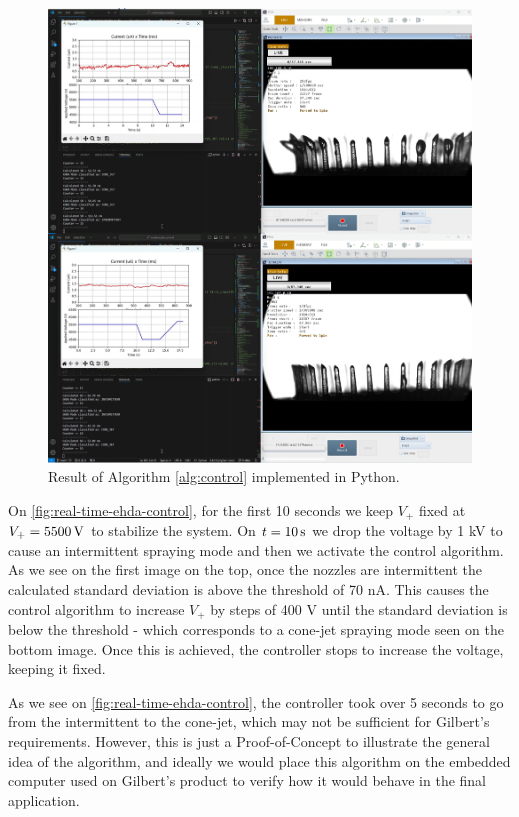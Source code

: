 \documentclass[oneside,12pt]{article}
\begin{document}
\begin{figure}[h!]
    \centering
    \includegraphics[width=\textwidth,trim=1 1 1 1,clip]{figures/real-time-ehda-control.png}
    \caption{Result of Algorithm \ref{alg:control} implemented in Python.}
    \label{fig:real-time-ehda-control}
\end{figure}

On \autoref{fig:real-time-ehda-control}, for the first 10 seconds we keep $V_+$ fixed at $V_+ = 5500 \,\mathrm{V}$ to stabilize the system.
On $t = 10 \,\mathrm{s}$ we drop the voltage by 1 kV to cause an intermittent spraying mode and then we activate the control algorithm. 
As we see on the first image on the top, once the nozzles are intermittent the calculated standard deviation is above the threshold of
70 nA. This causes the control algorithm to increase $V_+$ by steps of 400 V until the standard deviation is below the threshold - which
corresponds to a cone-jet spraying mode seen on the bottom image.
Once this is achieved, the controller stops to increase the voltage, keeping it fixed.  

As we see on \autoref{fig:real-time-ehda-control}, the controller took over 5 seconds to go from the intermittent to the cone-jet, which 
may not be sufficient for Gilbert's requirements. However, this is just a Proof-of-Concept to illustrate the general idea of the algorithm,
and ideally we would place this algorithm on the embedded computer used on Gilbert's product to verify how it would behave in the final
application.
\end{document}
